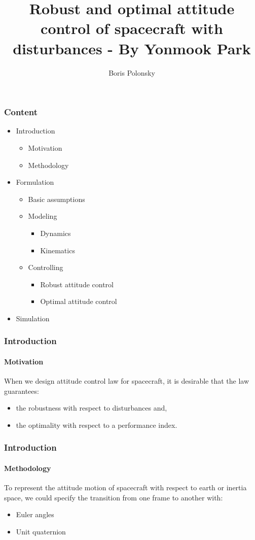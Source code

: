 \documentclass{beamer}
\begin{document}
\title{Robust and optimal attitude control of spacecraft with disturbances - By Yonmook Park} 

\author{Boris Polonsky}

\institute{}

\begin{frame}
\titlepage
\end{frame}

\begin{frame}
\frametitle{Content}
\begin{itemize}
	\item Introduction
	\begin{itemize}
		\item Motivation
		\item Methodology
	\end{itemize}
	\item Formulation
	\begin{itemize}
		\item Basic assumptions
		\item Modeling
		\begin{itemize}
			\item Dynamics
			\item Kinematics
		\end{itemize}
		\item Controlling
		\begin{itemize}
			\item Robust attitude control
			\item Optimal attitude control
		\end{itemize}
	\end{itemize}
	\item Simulation
	\end{itemize}
\end{frame}

\begin{frame}
\frametitle{Introduction}
\framesubtitle{Motivation}
When we design attitude control law for spacecraft, it is desirable that the law guarantees:
\begin{itemize}
	\item the robustness with respect to disturbances and,
	\item the optimality with respect to a performance index.
\end{itemize}
\end{frame}

\begin{frame}
\frametitle{Introduction}
\framesubtitle{Methodology}
To represent the attitude motion of spacecraft with respect to earth or inertia space, we could specify the transition from one frame to another with:
\begin{itemize}
	\item Euler angles
	\item Unit quaternion
\end{itemize}
\end{frame}
\end{document}
